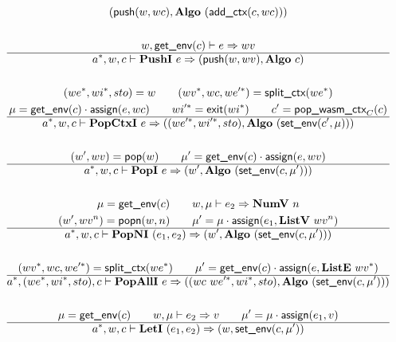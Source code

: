 \begin{gather*}
  (\push(w, wc), \algo ~ (\addctx(c, wc))) \\
%
\newline \\
  w, \getenv(c) \vdash e \Rightarrow wv \\
  \hline
  \seq{a}, w, c \vdash \pushi ~ e \Rightarrow (\push(w, wv), \algo ~ c) \\
%
\newline \\
  (\seq{we}, \seq{wi}, sto) = w \qquad
  (\seq{wv}, wc, \seq{we'}) = \splitctx(\seq{we}) \\
  \mu = \getenv(c) \cdot \assign(e, wc) \qquad
  \seq{wi'} = \exit(\seq{wi}) \qquad
  c' = \popwasmctx_{C}(c) \\
  \hline
  \seq{a}, w, c \vdash \popctxi ~ e
  \Rightarrow
  ((\seq{we'}, \seq{wi'}, sto), \algo ~ (\setenv(c', \mu))) \\
%
\newline \\
  (w', wv) = \pop(w) \qquad
  \mu' = \getenv(c) \cdot \assign(e, wv) \\
  \hline
  \seq{a}, w, c \vdash \popi ~ e \Rightarrow (w', \algo ~ (\setenv(c, \mu'))) \\
%
\newline \\
  \mu = \getenv(c) \qquad
  w, \mu \vdash e_2 \Rightarrow \numv ~ n \\
  (w', wv^n) = \popn(w, n) \qquad
  \mu' = \mu \cdot \assign(e_1, \listv ~ wv^n) \\
  \hline
  \seq{a}, w, c \vdash \popni ~ (e_1, e_2) \Rightarrow
  (w', \algo ~ (\setenv(c, \mu'))) \\
%
\newline \\
  (\seq{wv}, wc, \seq{we'}) = \splitctx(\seq{we}) \qquad
  \mu' = \getenv(c) \cdot \assign(e, \liste ~ \seq{wv}) \\
  \hline
  \seq{a}, (\seq{we}, \seq{wi}, sto), c \vdash \popalli ~ e
  \Rightarrow
  ((wc ~ \seq{we'}, \seq{wi}, sto), \algo ~ (\setenv(c, \mu'))) \\
%
\newline \\
  \mu = \getenv(c) \qquad
  w, \mu \vdash e_2 \Rightarrow v \qquad
  \mu' = \mu \cdot \assign(e_1, v) \\
  \hline
  \seq{a}, w, c \vdash \leti ~ (e_1, e_2)
  \Rightarrow
  (w, \setenv(c, \mu')) \\
%
\newline \\

\end{gather*}
